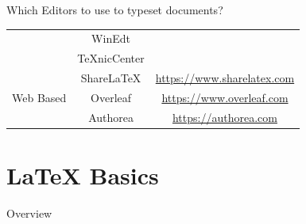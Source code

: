 \documentclass[style=lehigh,orient=landscape]{powerdot}
\newcommand{\cmark}{\ding{51}}
\begin{document}
\begin{wideslide}[toc=]{Which Editors to use to typeset documents?}
\begin{center}
\begin{tabular}{|c|c|ccc|}
                                         & WinEdt       & \cmark  &          &        \\
                                         & TeXnicCenter & \cmark  &          &        \\
        \hline
        \multirow{3}{*}{Web Based}       & Share\LaTeX{} & \multicolumn{3}{c|}{\url{https://www.sharelatex.com}}\\
                                         & Overleaf      & \multicolumn{3}{c|}{\url{https://www.overleaf.com}}\\
                                         & Authorea      & \multicolumn{3}{c|}{\url{https://authorea.com}}\\
        \hline
        \end{tabular}
    \end{center}
\end{wideslide}

\section[slide=false]{\LaTeX{} Basics}
\begin{wideslide}[toc=,bm=]{Overview}
  \tableofcontents[content=currentsection,type=0]
\end{wideslide}
\end{document}
